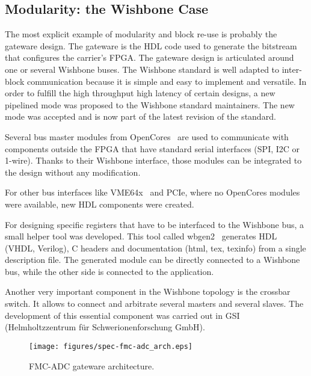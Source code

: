 \documentclass{JAC2003}
\begin{document}
\subsection{Modularity: the Wishbone Case}
The most explicit example of modularity and block re-use is probably the gateware design.
The gateware is the HDL code used to generate the bitstream that configures the carrier's FPGA.
The gateware design is articulated around one or several Wishbone buses.
The Wishbone standard is well adapted to inter-block communication because it is simple and easy to implement and versatile.
In order to fulfill the high throughput high latency of certain designs, a new pipelined mode was proposed to the Wishbone standard maintainers. The new mode was accepted and is now part of the latest revision of the standard.

Several bus master modules from OpenCores~\cite{opencores} are used to communicate with components outside the FPGA that have standard serial interfaces (SPI, I2C or 1-wire).
Thanks to their Wishbone interface, those modules can be integrated to the design without any modification.

For other bus interfaces like VME64x~\cite{vme} and PCIe, where no OpenCores modules were available, new HDL components were created.

For designing specific registers that have to be interfaced to the Wishbone bus, a small helper tool was developed.
This tool called wbgen2~\cite{wbgen2} generates HDL (VHDL, Verilog), C headers and documentation (html, tex, texinfo) from a single description file.
The generated module can be directly connected to a Wishbone bus, while the other side is connected to the application.

Another very important component in the Wishbone topology is the crossbar switch.
It allows to connect and arbitrate several masters and several slaves.
The development of this essential component was carried out in GSI (Helmholtzzentrum f\"ur Schwerionenforschung GmbH).

\begin{figure}[htb]
   \centering
   \texttt{[image: figures/spec-fmc-adc\_arch.eps]}
   \caption{FMC-ADC gateware architecture.}
   \label{spec-fmc-adc_arch}
\end{figure}
\end{document}
